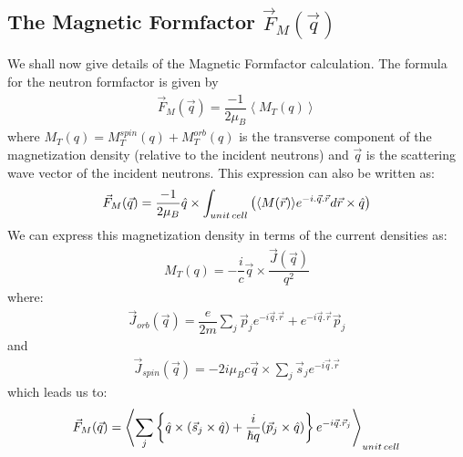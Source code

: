 \documentclass[10pt]{ruthesis}
\begin{document}
{\subsection{The Magnetic Formfactor $\vec{F}_{M}(\vec{q})$}
We shall now give details of the Magnetic Formfactor calculation. The formula for the neutron formfactor is given by 
\begin{align}
\vec{F}_{M}(\vec{q})=\dfrac{-1}{2\mu_{B}} \left \langle M_{T}(q) \right \rangle
\end{align}
where $M_{T}(q)=M_{T}^{spin}(q)+M_{T}^{orb}(q)$ is the transverse component of the magnetization density (relative to the incident neutrons)  and $\vec{q}$ is the scattering wave vector of the incident neutrons. This expression  can also be written as:
\begin{align}
\vec{F}_{M}(\vec q)=\dfrac{-1}{2\mu_{B}} \hat{q} \times \int_{unit \hspace{0.5mm} cell} \left(\langle M(\vec{r})\rangle e^{-i.\vec{q}.\vec{r}} d \vec{r} \times \hat{q} \right)
\end{align}
 We can express this magnetization density  in terms of the current densities as:
 \begin{align}
 M_{T}(q)=-\dfrac{i}{c}\vec{q} \times \dfrac{\vec{J}(\vec{q})}{q^{2}}
 \end{align}
where:
\begin{align}
\vec{J}_{orb}(\vec{q})=\dfrac{e}{2m}\sum_{j} \vec p_{j}e^{-i \vec{q}.\vec{r}} + e^{-i\vec{q}.\vec{r}} \vec{p}_{j}
\end{align}
and 
\begin{align}
\vec{J}_{spin}(\vec{q})=-2i \mu_{B} c \vec{q} \times \sum_{j} \vec{s}_{j}e^{-i \vec{q}.\vec{r}}
\end{align}
 which leads us to:
\begin{align} \label{Fm1}
\vec{F}_{M}(\vec q)= \left \langle \sum_{j} \left \lbrace \hat{q} \times (\vec{s}_{j} \times \hat{q}) + \dfrac{i}{\hslash q}(\vec{p}_{j} \times \hat{q}) \right \rbrace e^{-i \vec{q} .\vec{r}_{j}} \right \rangle _{ unit \hspace{0.5mm} cell}
\end{align} 

}
\end{document}
